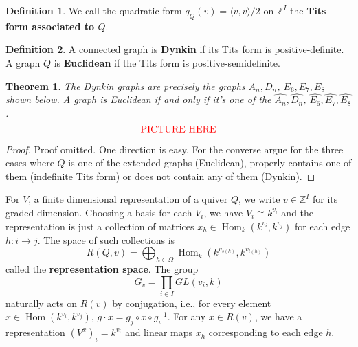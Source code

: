 \documentclass[12pt]{report}
\newtheorem{theorem}{Theorem}[section]
\theoremstyle{remark}
\theoremstyle{definition}
\newtheorem{definition}{Definition}[section]
\newcommand{\Z}[0]{\mathbb{Z}}
\newcommand{\Hom}[0]{\operatorname{Hom}}
\begin{document}
    \begin{definition}
        We call the quadratic form $q_Q(v)=\langle v,v\rangle/2$ on $\Z^I$ the \textbf{Tits form associated to $Q$}.
    \end{definition}
    \begin{definition}
        A connected graph is \textbf{Dynkin} if its Tits form is positive-definite. A graph $Q$ is \textbf{Euclidean} if the Tits form is positive-semidefinite.
    \end{definition}
    \begin{theorem}
        The Dynkin graphs are precisely the graphs $A_n, D_n$, $E_6, E_7, E_8$ shown below. A graph is Euclidean if and only if it's one of the $\widehat{A_n},\widehat{D_n}$, $\widehat{E_6}, \widehat{E_7}, \widehat{E_8}$.
        \[\textcolor{red}{\text{PICTURE HERE}}\]
    \end{theorem}
    \begin{proof}
        Proof omitted. One direction is easy. For the converse argue for the three cases where $Q$ is one of the extended graphs (Euclidean), properly contains one of them (indefinite Tits form) or does not contain any of them (Dynkin).
    \end{proof}
    For $V$, a finite dimensional representation of a quiver $Q$, we write $v\in\Z^I$ for its graded dimension. Choosing a basis for each $V_i$, we have $V_i\cong k^{v_i}$ and the representation is just a collection of matrices $x_h\in\Hom_k(k^{v_i}, k^{v_j})$ for each edge $h:i\to j$. The space of such collections is
    \[R(Q, v)=\bigoplus_{h\in\Omega}\Hom_k(k^{v_{s(h)}}, k^{v_{t(h)}})\]
    called the \textbf{representation space}. The group
    \[G_v=\prod_{i\in I}GL(v_i, k)\]
    naturally acts on $R(v)$ by conjugation, i.e., for every element $x\in\Hom(k^{v_i}, k^{v_j})$, $g\cdot x=g_j\circ x\circ g_i^{-1}$. For any $x\in R(v)$, we have a representation $(V^x)_i=k^{v_i}$ and linear maps $x_h$ corresponding to each edge $h$.
\end{document}
